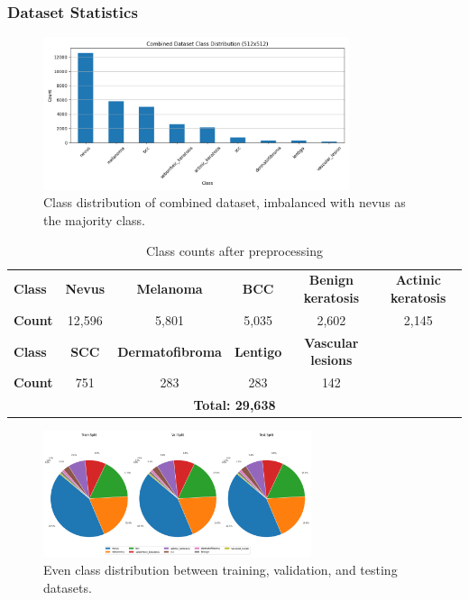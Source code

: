 \documentclass{article} %
\begin{document}
\subsubsection{Dataset Statistics}

\begin{figure}[H]
\begin{center}
\includegraphics[width=0.8\textwidth]{Figs/class_distribution.png}
\end{center}
\caption{Class distribution of combined dataset, imbalanced with nevus as the majority class.}
\end{figure}

\begin{table}[h]
\caption{Class counts after preprocessing}
\label{class-counts}
\begin{center}
\footnotesize
\begin{tabular}{lccccc}
\toprule
\textbf{Class} & \textbf{Nevus} & \textbf{Melanoma} & \textbf{BCC} & \textbf{Benign keratosis} & \textbf{Actinic keratosis} \\
\textbf{Count} & 12,596 & 5,801 & 5,035 & 2,602 & 2,145 \\
\midrule
\textbf{Class} & \textbf{SCC} & \textbf{Dermatofibroma} & \textbf{Lentigo} & \textbf{Vascular lesions} & \\
\textbf{Count} & 751 & 283 & 283 & 142 & \\
\midrule
\multicolumn{6}{c}{\textbf{Total: 29,638}} \\
\bottomrule
\end{tabular}
\end{center}
\end{table}

\begin{figure}[H]
\begin{center}
\includegraphics[width=0.7\textwidth]{Figs/dataset_split_distribution.png}
\end{center}
\caption{Even class distribution between training, validation, and testing datasets.}
\end{figure}
\end{document}
